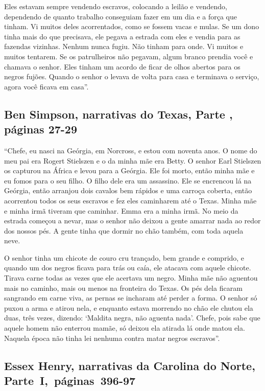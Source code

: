 Eles estavam sempre vendendo escravos, colocando a leilão e vendendo,
dependendo de quanto trabalho conseguiam fazer em um dia e a força que
tinham. Vi muitos deles acorrentados, como se fossem vacas e mulas. Se
um dono tinha mais do que precisava, ele pegava a estrada com eles e
vendia para as fazendas vizinhas. Nenhum nunca fugiu. Não tinham para
onde. Vi muitos e muitos tentarem. Se os patrulheiros não pegavam, algum
branco prendia você e chamava o senhor. Eles tinham um acordo de ficar
de olhos abertos para os negros fujões. Quando o senhor o levava de
volta para casa e terminava o serviço, agora você ficava em casa''.

\subsection{Ben Simpson, narrativas do Texas, Parte , páginas 27-29}
\label{ref240}

``Chefe, eu nasci na Geórgia, em Norcross, e estou com noventa anos. O
nome do meu pai era Rogert Stielszen e o da minha mãe era Betty. O
senhor Earl Stielszen os capturou na África e levou para a Geórgia. Ele
foi morto, então minha mãe e eu fomos para o seu filho. O filho dele era
um assassino. Ele se encrencou lá na Geórgia, então arranjou dois
cavalos bem rápidos e uma carroça coberta, então acorrentou todos os
seus escravos e fez eles caminharem até o Texas. Minha mãe e minha irmã
tiveram que caminhar. Emma era a minha irmã. No meio da estrada começou
a nevar, mas o senhor não deixou a gente amarrar nada ao redor dos
nossos pés. A gente tinha que dormir no chão também, com toda aquela
neve.

O senhor tinha um chicote de couro cru trançado, bem grande e comprido,
e quando um dos negros ficava para trás ou caía, ele atacava com aquele
chicote. Tirava carne todas as vezes que ele acertava um negro. Minha
mãe não aguentou mais no caminho, mais ou menos na fronteira do Texas.
Os pés dela ficaram sangrando em carne viva, as pernas se incharam até
perder a forma. O senhor só puxou a arma e atirou nela, e enquanto
estava morrendo no chão ele chutou ela duas, três vezes, dizendo:
`Maldita negra, não aguenta nada'. Chefe, pois sabe que aquele homem não
enterrou mamãe, só deixou ela atirada lá onde matou ela. Naquela época
não tinha lei nenhuma contra matar negros escravos''.

\subsection{Essex Henry, narrativas da Carolina do Norte, Parte~I,~páginas~396-97}
\label{ref136}

